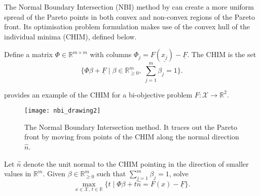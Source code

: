 \documentclass[main.tex]{subfiles}
\begin{document}
The Normal Boundary Intersection (NBI) method by \citet{das1998normal} can
create a more uniform spread of the Pareto points in both convex and
non-convex regions of the Pareto front. Its optimisation problem
formulation makes use of the convex hull of the individual minima
(CHIM), defined below.
\begin{mydef}
  Define a matrix $\Phi\in\mathbb{R}^{m\times m}$ with columns
  $\Phi_j = F(\underline{x_j})-\underline{F}$.
  The CHIM is the set
  \begin{equation}\textstyle
    \{\Phi\beta + \underline{F} \mid \beta\in\mathbb{R}_{\geq 0}^m,\;\sum_{j=1}^m\beta_j = 1\}.
  \end{equation}
\end{mydef}

\begin{example}
   provides an example of the CHIM for a
  bi-objective problem $F:\mathcal{X}\to\mathbb{R}^2$.
  \begin{figure}[htbp]
    \centering
    \texttt{[image: nbi\_drawing2]}
    \caption{The Normal Boundary Intersection method. It traces out the
      Pareto front by moving from points of the CHIM along the normal
      direction $\hat n$.}\label{fig:nbi_drawing2}
  \end{figure}
\end{example}

\begin{mydef}
  Let $\hat{n}$ denote the unit normal to the CHIM pointing in the
  direction of smaller values in $\mathbb{R}^m$.
  Given $\beta\in\mathbb{R}_{\geq 0}^m$ such that
  $\sum_{j=1}^m\beta_j=1$, solve
  \begin{equation}
    \max_{x\in\mathcal{X},\,t\in\mathbb{R}} \{t \mid \Phi\beta +
    t\hat{n} = F(x) - \underline{F}\}.
  \end{equation}
\end{mydef}
\end{document}
